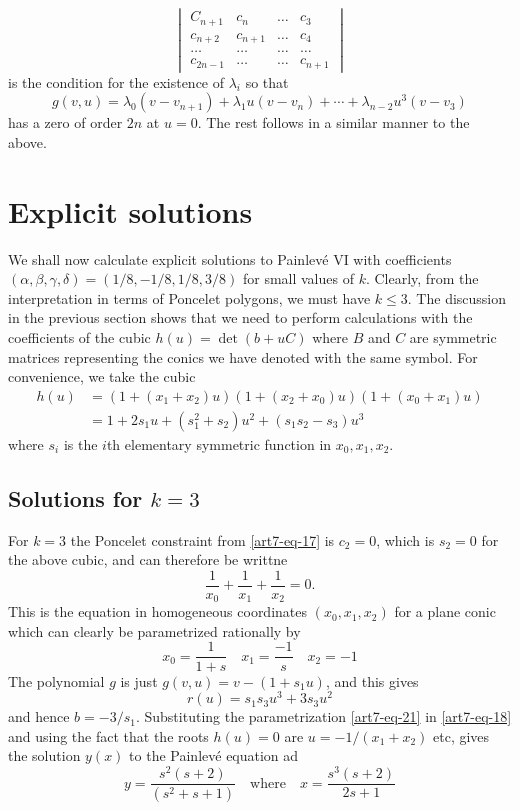 $$
\begin{vmatrix}
C_{n+1} & c_{n} & \ldots  & c_{3}\\
c_{n+2} & c_{n+1} & \ldots & c_{4}\\
\ldots & \ldots & \ldots & \ldots\\
c_{2n-1} & \ldots &\ldots & c_{n+1}
\end{vmatrix}
$$
is the condition for the existence of $\lambda_{i}$ so that
$$
g(v,u) =\lambda_{0}(v-v_{n+1}) + \lambda_{1}u(v-v_{n}) + \cdots+\lambda_{n-2}u^{3}(v-v_{3})
$$
has a zero of order $2n$ at $u=0$. The rest follows in a similar manner to the above.

\section{Explicit solutions}\label{art7-sec-6}

We shall now calculate explicit solutions to Painlev\'e VI with coefficients $(\alpha,\beta, \gamma, \delta)=(1/8,-1/8,1/8,3/8)$ for small values of $k$. Clearly, from the interpretation in terms of Poncelet polygons, we must have $k\leq 3$. The discussion in the previous section shows that we need to perform calculations with the coefficients of the cubic $h(u)=\det(b+uC)$ where $B$ and $C$ are symmetric matrices representing the conics we have denoted with the same symbol. For convenience, we take the cubic
\begin{align}\label{art7-eq-20}
h(u) &=(1+(x_{1}+x_{2})u)(1+(x_{2}+x_{0})u)(1+(x_{0}+x_{1})u)\nonumber\\
     &=1+2s_{1}u + (s_{1}^{2}+s_{2})u^{2} +(s_{1}s_{2}-s_{3})u^{3}
\end{align}
where $s_{i}$ is the $i$th elementary symmetric function in $x_{0}, x_{1},x_{2}$. 

\subsection{Solutions for $k=3$}\label{art7-subsec-6.1}
For $k=3$ the Poncelet constraint from \eqref{art7-eq-17} is $c_{2}=0$, which is $s_{2}=0$ for the above cubic, and can therefore be writtne
$$
\dfrac{1}{x_{0}}+\dfrac{1}{x_{1}} +\dfrac{1}{x_{2}}=0.
$$
This is the equation in homogeneous coordinates $(x_{0}, x_{1},x_{2})$ for a plane conic which can clearly be parametrized rationally by
\begin{equation}\label{art7-eq-21}
x_{0}=\dfrac{1}{1+s} \quad x_{1}=\dfrac{-1}{s} \quad x_{2}=-1
\end{equation}
The polynomial $g$ is just $g(v,u) = v-(1+s_{1}u)$, and this gives
$$
r(u)=s_{1}s_{3}u^{3} +3s_{3}u^{2}
$$
and hence $b=-3/s_{1}$. Substituting the parametrization \eqref{art7-eq-21} in \eqref{art7-eq-18} and using the fact that the roots $h(u)=0$ are $u =-1/(x_{1}+x_{2})$ etc, gives the solution $y(x)$ to the Painlev\'e equation ad
$$
y = \dfrac{s^{2}(s+2)}{(s^{2}+s+1)} \quad \text{where} \quad x=\dfrac{s^{3}(s+2)}{2s+1}
$$

